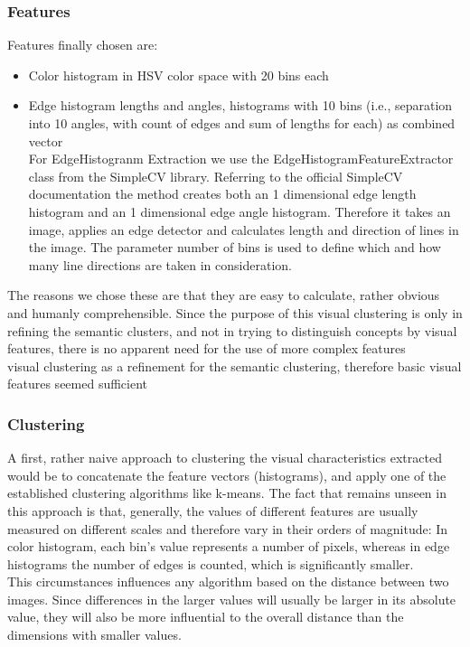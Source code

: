 \subsubsection{Features}
Features finally chosen are:
\begin{itemize}
\item{Color histogram} in HSV color space with 20 bins each
\item{Edge histogram} lengths and angles, histograms with 10 bins (i.e., separation into 10 angles, with count of edges and sum of lengths for each) as combined vector 
\\
For EdgeHistogranm Extraction we use the EdgeHistogramFeatureExtractor class from the SimpleCV library. Referring to the official SimpleCV documentation   the method creates both an 1 dimensional edge length histogram and an 1 dimensional edge angle histogram. Therefore it takes an image, applies an edge detector and calculates length and direction of lines in the image. The parameter number of bins is used to define which and how many line directions are taken in consideration.  
\end{itemize}
The reasons we chose these are that they are easy to calculate, rather obvious and humanly comprehensible. Since the purpose of this visual clustering is only in refining the semantic clusters, and not in trying to distinguish concepts by visual features, there is no apparent need for the use of more complex features \\
visual clustering as a refinement for the semantic clustering, therefore basic visual features seemed sufficient 


\subsubsection{Clustering}
A first, rather naive approach to clustering the visual characteristics extracted would be to concatenate the feature vectors (histograms), and apply one of the established clustering algorithms like k-means.  The fact that remains unseen in this approach is that, generally, the values of different features are usually measured on different scales and therefore vary in their orders of magnitude: In color histogram, each bin's value represents a number of pixels, whereas in edge histograms the number of edges is counted, which is significantly smaller. \\
This circumstances influences any algorithm based on the distance between two images. Since differences in the larger values will usually be larger in its absolute value, they will also be more influential to the overall distance than the dimensions with smaller values.

